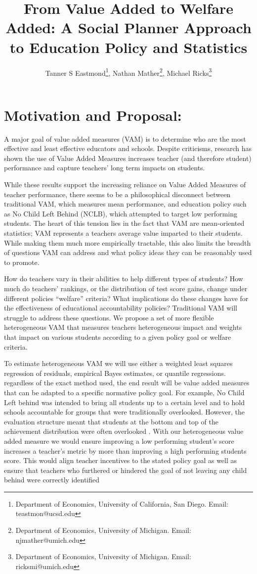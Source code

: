 \documentclass[letterpaper,12pt]{article}
\title{From Value Added to Welfare Added: A Social Planner Approach to Education Policy and Statistics}
\author{Tanner S Eastmond\thanks{Department of Economics, University of California, San Diego. Email: teastmon@ucsd.edu}, Nathan Mather\thanks{Department of Economics, University of Michigan. Email: njmather@umich.edu }, Michael Ricks\thanks{Department of Economics, University of Michigan. Email: ricksmi@umich.edu}}
\date{\vspace{-8ex}}
\begin{document}
\maketitle

\section{Motivation and Proposal:}
A major goal of value added measures (VAM) is to determine who are the most effective and least effective educators and schools. Despite criticisms, research has shown the use of Value Added Measures increases  teacher (and therefore student) performance and capture teachers' long term impacts on students\citep{chetty2014measuring2, pope2019effect}. 

While these results support the increasing reliance on Value Added Measures of teacher performance, there seems to be a philosophical disconnect between traditional  VAM, which measures mean performance, and education policy such as No Child Left Behind (NCLB), which attempted to target low performing students. The heart of this tension lies in the fact that VAM are mean-oriented statistics; VAM represents a teachers average value imparted to their students. While making them much more empirically tractable, this also limits the breadth of questions VAM can address and what policy ideas they can be reasonably used to promote. 

How do teachers vary in their abilities to help different types of students? How much do teachers' rankings, or the distribution of test score gains, change under different policies ``welfare'' criteria?  What implications do these changes have for the effectiveness of educational accountability policies? Traditional VAM will struggle to address these questions.  We propose a set of more flexible heterogeneous VAM that measures teachers heterogeneous impact and weights that impact on various students according to a given policy goal or welfare criteria. 

To estimate heterogeneous VAM we will use either a weighted least squares regression of residuals, empirical Bayes estimates, or quantile regressions. regardless of the exact method used, the end result will be value added measures that can be adapted to a specific normative policy goal. For example, No Child Left behind was intended to bring all students up to a certain level and to hold schools accountable for groups that were traditionally overlooked. However, the evaluation structure meant that students at the bottom and top of the achievement distribution were often overlooked \citep{neal2010left}. With our heterogeneous value added measure we would ensure improving a low performing student's score increases a teacher's metric by more than improving a high performing students score. This would align teacher incentives to the stated policy goal as well as ensure that teachers who furthered or hindered the goal of not leaving any child behind were correctly identified
\end{document}
